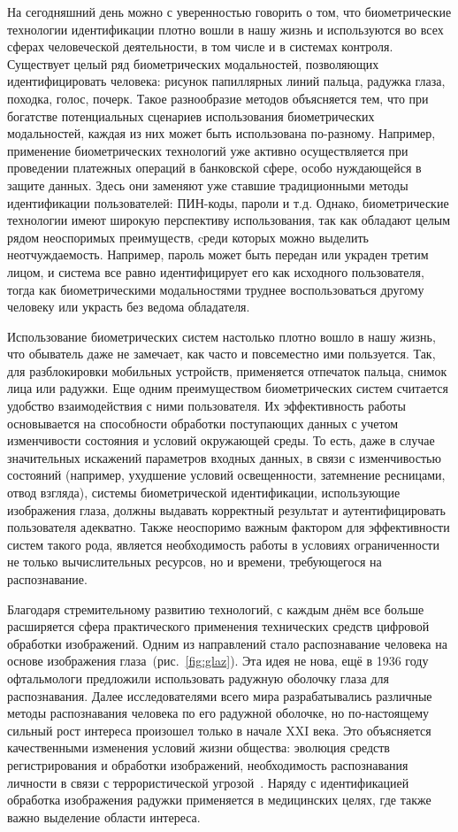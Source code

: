 \documentclass[12pt]{article} %
\begin{document}
На сегодняшний день можно с уверенностью говорить о том, что биометрические технологии идентификации плотно вошли в нашу жизнь и используются во всех сферах человеческой деятельности, в том числе и в системах контроля. Существует целый ряд биометрических модальностей, позволяющих идентифицировать человека: рисунок папиллярных линий пальца, радужка глаза, походка, голос, почерк. Такое разнообразие методов объясняется тем, что при богатстве потенциальных сценариев использования биометрических модальностей, каждая из них может быть использована по-разному. Например, применение биометрических технологий уже активно осуществляется при проведении платежных операций в банковской сфере, особо нуждающейся в защите данных. Здесь они заменяют уже ставшие традиционными методы идентификации пользователей: ПИН-коды, пароли и т.д. Однако, биометрические технологии имеют широкую перспективу использования, так как обладают целым рядом неоспоримых преимуществ, cреди которых можно выделить неотчуждаемость. Например, пароль может быть передан или украден третим лицом, и система все равно идентифицирует его как исходного пользователя, тогда как биометрическими модальностями труднее воспользоваться другому человеку или украсть без ведома обладателя. 

Использование биометрических систем настолько плотно вошло в нашу жизнь, что обыватель даже не замечает, как часто и повсеместно ими пользуется. Так, для разблокировки мобильных устройств, применяется отпечаток пальца, снимок лица или радужки. Еще одним преимуществом биометрических систем считается удобство взаимодействия с ними пользователя. Их эффективность работы основывается на способности обработки поступающих данных с учетом изменчивости состояния и условий окружающей среды. То есть, даже в случае значительных искажений параметров входных данных, в связи с изменчивостью состояний (например, ухудшение условий освещенности, затемнение ресницами, отвод взгляда), системы биометрической идентификации, использующие изображения глаза, должны выдавать корректный результат и аутентифицировать пользователя адекватно. Также неоспоримо важным фактором для эффективности систем такого рода, является необходимость работы в условиях ограниченности не только вычислительных ресурсов, но и времени, требующегося на распознавание. 

Благодаря стремительному развитию технологий, с каждым днём все больше расширяется сфера практического применения технических средств цифровой обработки изображений. Одним из направлений стало распознавание человека на основе изображения глаза~(рис.~\ref{fig:glaz}). Эта идея не нова, ещё в 1936 году офтальмологи \cite{Medic} предложили использовать радужную оболочку глаза для распознавания. Далее исследователями всего мира разрабатывались различные методы распознавания человека по его радужной оболочке, но по-настоящему сильный рост интереса произошел только в начале XXI века. Это объясняется качественными изменения условий жизни общества: эволюция средств регистрирования и обработки изображений, необходимость распознавания личности в связи с террористической угрозой~\cite{Conf3, Terr, Tech}. Наряду с идентификацией обработка изображения радужки применяется в медицинских целях, где также важно выделение области интереса. 
\end{document}
